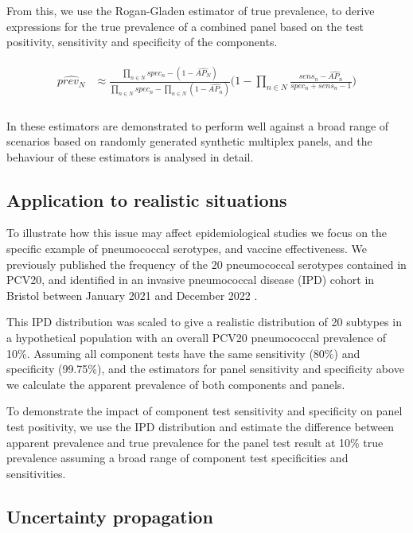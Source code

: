 \documentclass[10pt,letterpaper]{article}
\begin{document}
From this, we use the Rogan-Gladen estimator of true prevalence\cite{rogan1978}, to derive expressions for the true prevalence of a combined panel based on the test positivity, sensitivity and specificity of the components.

\begin{eqnarray}
\label{eq:schemeP2}
\begin{aligned}
\widehat{prev_{N}} &\approx \frac{
    \prod_{n \in N}{spec_n} -(1-\widehat{AP_{N}})
  }{
    \prod_{n \in N}{spec_n}
    -\prod_{n \in N}{(1-\widehat{AP_n})}
  } \bigg(1 - \prod_{n \in N}{ \frac{sens_n-\widehat{AP_n}}{spec_n + sens_n - 1} } \bigg ) \\
\end{aligned}
\end{eqnarray}

In  these estimators are demonstrated to perform well against a broad range of scenarios based on randomly generated synthetic multiplex panels, and the behaviour of these estimators is analysed in detail.

\subsection*{Application to realistic situations}

To illustrate how this issue may affect epidemiological studies we focus on the specific example of pneumococcal serotypes, and vaccine effectiveness. We previously published the frequency of the 20 pneumococcal serotypes contained in PCV20, and identified in an invasive pneumococcal disease (IPD) cohort in Bristol between January 2021 and December 2022 \cite{hyams2023a}.

This IPD distribution was scaled to give a realistic distribution of 20 subtypes in a hypothetical population with an overall PCV20 pneumococcal prevalence of 10\%. Assuming all component tests have the same sensitivity (80\%) and specificity (99.75\%), and the estimators for panel sensitivity and specificity above we calculate the apparent prevalence of both components and panels.

To demonstrate the impact of component test sensitivity and specificity on panel test positivity, we use the IPD distribution and estimate the difference between apparent prevalence and true prevalence for the panel test result at 10\% true prevalence assuming a broad range of component test specificities and sensitivities.

\subsection*{Uncertainty propagation}
\end{document}

